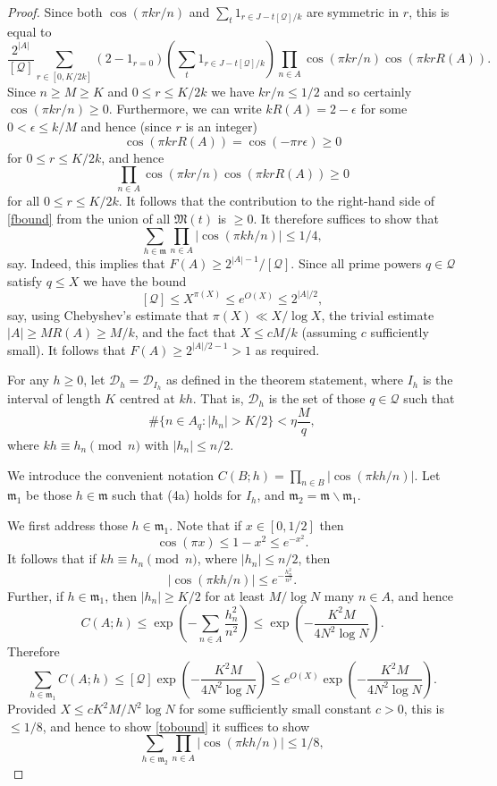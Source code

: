\documentclass[12pt]{amsart}
\newcommand{\abs}[1]{\left\lvert #1\right\rvert}
\newcommand{\brac}[1]{\left( #1\right)}
\begin{document}
\begin{proof}
Since both $\cos(\pi kr/n)$ and $\sum_t 1_{r\in J-t[\mathcal{Q}]/k}$ are symmetric in $r$, this is equal to
\[\frac{2^{\abs{A}}}{[\mathcal{Q}]}\sum_{r\in [0,K/2k]}(2-1_{r=0})\brac{\sum_{t}1_{r\in J-t[\mathcal{Q}]/k}}\prod_{n\in A}\cos(\pi kr/n)\cos(\pi kr R(A)).\]
Since $n\geq M\geq K$ and $0\leq r\leq K/2k$ we have $kr/n\leq 1/2$ and so certainly $\cos(\pi kr/n)\geq 0$. Furthermore, we can write $kR(A)=2-\epsilon$ for some $0<\epsilon\leq k/M$ and hence (since $r$ is an integer)
\[\cos(\pi kr R(A)) = \cos(-\pi r\epsilon)\geq 0\]
for $0\leq r\leq K/2k$, and hence 
\[\prod_{n\in A}\cos(\pi kr/n)\cos(\pi kr R(A))\geq 0\]
for all $0\leq r\leq K/2k$. It follows that the contribution to the right-hand side of \eqref{fbound} from the union of all $\mathfrak{M}(t)$ is $\geq 0$. It therefore suffices to show that 
\begin{equation}\label{tobound}
\sum_{h\in\mathfrak{m}}\prod_{n\in A}\abs{\cos(\pi kh/n)}\leq 1/4,
\end{equation}
say. Indeed, this implies that $F(A)\geq 2^{\abs{A}-1}/[\mathcal{Q}]$. Since all prime powers $q\in\mathcal{Q}$ satisfy $q\leq X$ we have the bound
\[ [\mathcal{Q}]\leq  X^{\pi(X)}\leq e^{O(X)}\leq 2^{\abs{A}/2},\]
say, using Chebyshev's estimate that $\pi(X)\ll X/\log X$, the trivial estimate $\abs{A}\geq MR(A)\geq M/k$, and the fact that $X\leq cM/k$ (assuming $c$ sufficiently small). It follows that $F(A)\geq 2^{\abs{A}/2-1}>1$ as required.


 
For any $h\geq 0$, let $\mathcal{D}_h=\mathcal{D}_{I_h}$ as defined in the theorem statement, where $I_h$ is the interval of length $K$ centred at $kh$. That is, $\mathcal{D}_h$ is the set of those $q\in \mathcal{Q}$ such that 
\[\#\{ n\in A_q:\abs{h_n}> K/2 \}< \eta \frac{M}{q},\]
where $kh\equiv h_n \pmod{n}$ with $\abs{h_n}\leq n/2$.

We introduce the convenient notation $C(B;h) = \prod_{n\in B}\abs{\cos(\pi kh/n)}$. Let $\mathfrak{m}_1$ be those $h\in\mathfrak{m}$ such that (4a) holds for $I_h$, and $\mathfrak{m}_2=\mathfrak{m}\backslash\mathfrak{m}_1$. 

We first address those $h\in\mathfrak{m}_1$. Note that if $x\in [0,1/2]$ then
\[\cos(\pi x) \leq 1-x^2\leq  e^{-x^2}.\]
It follows that if $kh\equiv h_n \pmod{n}$, where $\abs{h_n}\leq n/2$, then
\[\abs{\cos(\pi kh/n)}\leq e^{-\frac{h_n^2}{n^2}}.\] 
Further, if $h\in\mathfrak{m}_1$, then $\abs{h_n}\geq K/2$ for at least $M/\log N$ many $n\in A$, and hence
\[C(A;h)\leq \exp\brac{-\sum_{n\in A}\frac{h_n^2}{n^2}}\leq \exp\brac{-\frac{K^2M}{4N^2\log N}}.\]
Therefore
\[\sum_{h\in\mathfrak{m}_1}C(A;h)\leq [\mathcal{Q}]\exp\brac{-\frac{K^2M}{4N^2\log N}}\leq e^{O(X)}\exp\brac{-\frac{K^2M}{4N^2\log N}}.\]
Provided $X\leq c K^2M/N^2\log N$ for some sufficiently small constant $c>0$, this is $\leq 1/8$, and hence to show \eqref{tobound} it suffices to show 
\begin{equation}\label{tobound3}
\sum_{h\in\mathfrak{m}_2}\prod_{n\in A}\abs{\cos(\pi kh/n)}\leq 1/8,
\end{equation}


\end{proof}
\end{document}
